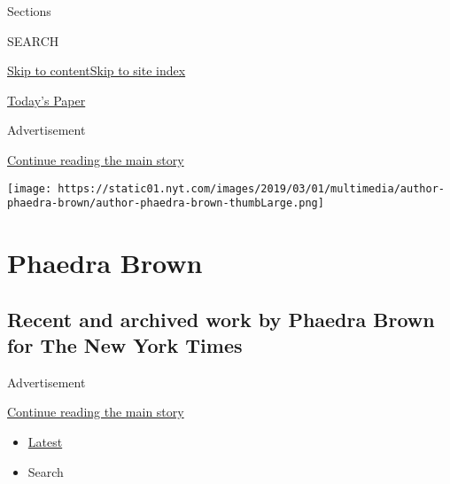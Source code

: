 Sections

SEARCH

\protect\hyperlink{site-content}{Skip to
content}\protect\hyperlink{site-index}{Skip to site index}

\href{https://myaccount.nytimes.com/auth/login?response_type=cookie\&client_id=vi}{}

\href{https://www.nytimes.com/section/todayspaper}{Today's Paper}

Advertisement

\protect\hyperlink{after-top}{Continue reading the main story}

\texttt{[image: https://static01.nyt.com/images/2019/03/01/multimedia/author-phaedra-brown/author-phaedra-brown-thumbLarge.png]}

\hypertarget{phaedra-brown}{%
\section{Phaedra Brown}\label{phaedra-brown}}

\hypertarget{recent-and-archived-work-by-phaedra-brown-for-the-new-york-times}{%
\subsection{Recent and archived work by Phaedra Brown for The New York
Times}\label{recent-and-archived-work-by-phaedra-brown-for-the-new-york-times}}

Advertisement

\protect\hyperlink{after-mid1}{Continue reading the main story}

\begin{itemize}
\tightlist
\item
  \protect\hyperlink{stream-panel}{Latest}
\item
  Search
\end{itemize}


